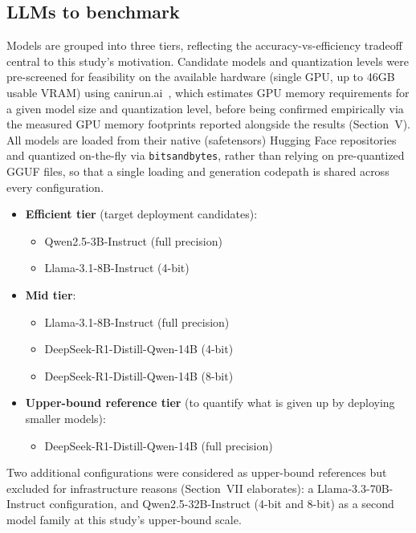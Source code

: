 \documentclass[conference]{IEEEtran}
\begin{document}
\subsection{LLMs to benchmark}

Models are grouped into three tiers, reflecting the accuracy-vs-efficiency tradeoff central to this study's motivation.
Candidate models and quantization levels were pre-screened for feasibility on the available hardware (single GPU, up to 46GB usable VRAM) using canirun.ai~\cite{canirun2026}, which estimates GPU memory requirements for a given model size and quantization level, before being confirmed empirically via the measured GPU memory footprints reported alongside the results (Section~V).
All models are loaded from their native (safetensors) Hugging Face repositories and quantized on-the-fly via \texttt{bitsandbytes}, rather than relying on pre-quantized GGUF files, so that a single loading and generation codepath is shared across every configuration.

\begin{itemize}
  \item \textbf{Efficient tier} (target deployment candidates):
  \begin{itemize}
    \item Qwen2.5-3B-Instruct (full precision)
    \item Llama-3.1-8B-Instruct (4-bit)
  \end{itemize}
  \item \textbf{Mid tier}:
  \begin{itemize}
    \item Llama-3.1-8B-Instruct (full precision)
    \item DeepSeek-R1-Distill-Qwen-14B (4-bit)
    \item DeepSeek-R1-Distill-Qwen-14B (8-bit)
  \end{itemize}
  \item \textbf{Upper-bound reference tier} (to quantify what is given up by deploying smaller models):
  \begin{itemize}
    \item DeepSeek-R1-Distill-Qwen-14B (full precision)
  \end{itemize}
\end{itemize}

Two additional configurations were considered as upper-bound references but excluded for infrastructure reasons (Section~VII elaborates): a Llama-3.3-70B-Instruct configuration, and Qwen2.5-32B-Instruct (4-bit and 8-bit) as a second model family at this study's upper-bound scale.
\end{document}
